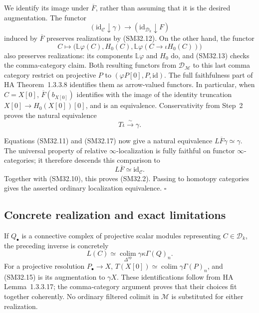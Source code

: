 We identify its image under \(\overline F\), rather than
assuming that it is the desired augmentation.  The functor
\[
 (\mathrm{id}_{\mathcal C}\downarrow\gamma)
       \longrightarrow(\mathrm{id}_{\mathcal D_k}\downarrow F)
\]
induced by \(\overline F\) preserves realizations by
(SM32.12).  On the other hand, the functor
\[
 C\longmapsto
 \bigl(\mathbb L\varphi(C),H_0(C),
       \mathbb L\varphi(C\to\iota H_0(C))\bigr)               \tag{SM32.16}
\]
also preserves realizations: its components
\(\mathbb L\varphi\) and \(H_0\) do, and (SM32.13)
checks the comma-category claim.  Both resulting functors from
\(\mathcal D_{\mathcal M}\) to this last comma category
restrict on projective \(P\) to
\((\varphi P[0],P,\mathrm{id})\).  The full faithfulness
part of HA Theorem~1.3.3.8 identifies them as arrow-valued
functors.  In particular, when \(C=X[0]\),
\(\overline F(b_{X[0]})\) identifies with the image of the
identity truncation \(X[0]\to H_0(X[0])[0]\), and is an
equivalence.  Conservativity from Step~2 proves the natural
equivalence
\[
                             T\iota\xrightarrow{\sim}\gamma. \tag{SM32.17}
\]

Equations (SM32.11) and (SM32.17) now give a natural equivalence
\(L\overline F\gamma\simeq\gamma\).  The universal property
of relative \(\infty\)-localization is fully faithful on
functor \(\infty\)-categories; it therefore descends this
comparison to
\[
                         L\overline F\simeq\mathrm{id}_{\mathcal C}.
                                                               \tag{SM32.18}
\]
Together with (SM32.10), this proves (SM32.2).
Passing to homotopy categories gives the asserted ordinary
localization equivalence. \(\square\)

\subsection{Concrete realization and exact limitations}
If \(Q_\bullet\) is a connective complex of projective scalar
modules representing \(C\in\mathcal D_k\), the preceding
inverse is concretely
\[
               L(C)\simeq
                  \operatorname*{colim}_{\Delta^{\mathrm{op}}}
                                      \gamma\kappa\Gamma(Q)_n.
                                                               \tag{SM32.19}
\]
For a projective resolution \(P_\bullet\to X\),
\(T(X[0])\simeq\operatorname*{colim}\gamma\Gamma(P)_n\),
and (SM32.15) is its augmentation to \(\gamma X\).
These identifications follow from HA Lemma~1.3.3.17; the
comma-category argument proves that their choices fit together
coherently.  No ordinary filtered colimit in \(\mathcal M\)
is substituted for either realization.

